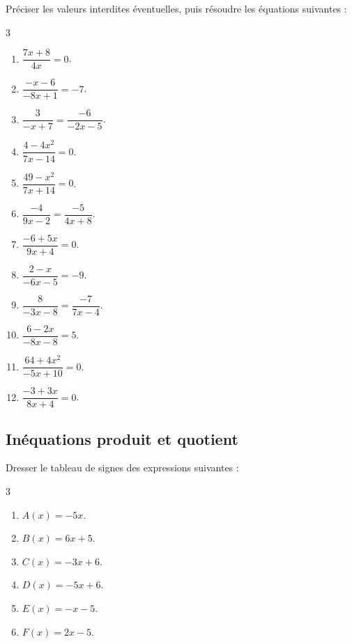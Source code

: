 {%
\begin{Exercice} %
Préciser les valeurs interdites éventuelles, puis résoudre les équations suivantes :
\vspace{-0.5cm}
\begin{multicols}{3}
\begin{enumerate}[itemsep=1em]
	\item $\dfrac{7x+8}{4x}=0$.
	\item $\dfrac{-x-6}{-8x+1}=-7$.
	\item $\dfrac{3}{-x+7}=\dfrac{-6}{-2x-5}$.
	\item $\dfrac{4-4x^2}{7x-14}=0$.
	\item $\dfrac{49-x^2}{7x+14}=0$.
	\item $\dfrac{-4}{9x-2}=\dfrac{-5}{4x+8}$.
	\item $\dfrac{-6+5x}{9x+4}=0$.
	\item $\dfrac{2-x}{-6x-5}=-9$.
	\item $\dfrac{8}{-3x-8}=\dfrac{-7}{7x-4}$.
	\item $\dfrac{6-2x}{-8x-8}=5$.
	\item $\dfrac{64+4x^2}{-5x+10}=0$.
	\item $\dfrac{-3+3x}{8x+4}=0$.
\end{enumerate}
\end{multicols}
\end{Exercice}
\subsection*{Inéquations produit et quotient}



\begin{Exercice}%
Dresser le tableau de signes des expressions suivantes :
\vspace{-0.5cm}
\begin{multicols}{3}
\begin{enumerate}[itemsep=1em,label={}]
	\item $A(x)=-5x$. 
	\item $B(x)=6x+5$.
	\item $C(x)=-3x+6$.
	\item $D(x)=-5x+6$.
	\item $E(x)=-x-5$.
	\item $F(x)=2x-5$.
\end{enumerate}
\end{multicols}
\end{Exercice}

}
